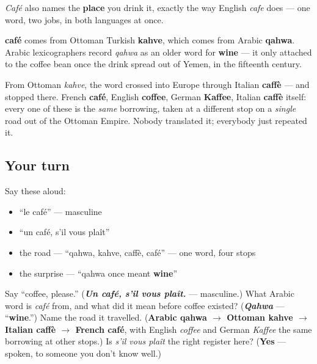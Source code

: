 \emph{Café} also names the \textbf{place} you drink it, exactly the way English \emph{cafe} does — one word, two jobs, in both languages at once.

\begin{cousinweb}
\textbf{café} comes from Ottoman Turkish \textbf{kahve}, which comes from Arabic \textbf{qahwa}. Arabic lexicographers record \emph{qahwa} as an older word for \textbf{wine} — it only attached to the coffee bean once the drink spread out of Yemen, in the fifteenth century.

From Ottoman \emph{kahve}, the word crossed into Europe through Italian \textbf{caffè} — and stopped there. French \textbf{café}, English \textbf{coffee}, German \textbf{Kaffee}, Italian \textbf{caffè} itself: every one of these is the \emph{same} borrowing, taken at a different stop on a \emph{single} road out of the Ottoman Empire. Nobody translated it; everybody just repeated it.
\end{cousinweb}

\subsection*{Your turn}
Say these aloud:

\begin{itemize}
\raggedright
  \item \textquotedblleft{}le café\textquotedblright{} — masculine
  \item \textquotedblleft{}un café, s'il vous plaît\textquotedblright{}
  \item the road — \textquotedblleft{}qahwa, kahve, caffè, café\textquotedblright{} — one word, four stops
  \item the surprise — \textquotedblleft{}qahwa once meant \textbf{wine}\textquotedblright{}
\end{itemize}

\begin{tcolorbox}[breakable,colback=teal!4,colframe=teal!35!black,title={Before you move on}]
Say \textquotedblleft{}coffee, please.\textquotedblright{} (\emph{\textbf{Un café, s'il vous plaît.}} — masculine.) What Arabic word is \emph{café} from, and what did it mean before coffee existed? (\emph{\textbf{Qahwa}} — \textquotedblleft{}\textbf{wine}.\textquotedblright{}) Name the road it travelled. (\textbf{Arabic qahwa $\to$ Ottoman kahve $\to$ Italian caffè $\to$ French café}, with English \emph{coffee} and German \emph{Kaffee} the same borrowing at other stops.) Is \emph{s'il vous plaît} the right register here? (\textbf{Yes} — spoken, to someone you don't know well.)
\end{tcolorbox}

